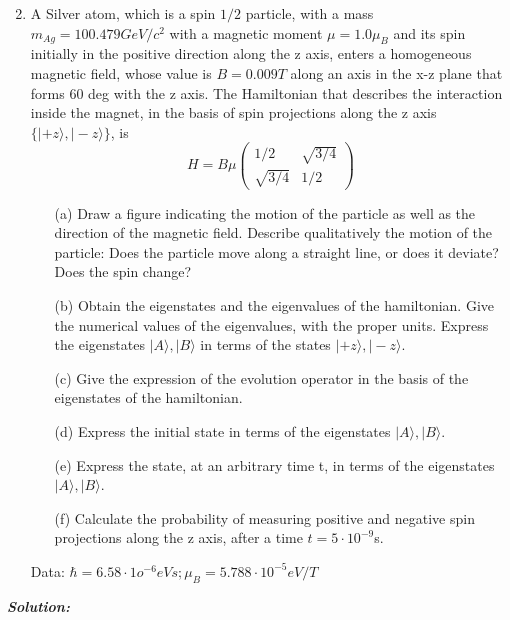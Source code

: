 \documentclass{article}
\begin{document}
\begin{mybox}
        \begin{enumerate}
        \setcounter{enumi}{1}
        \item A Silver atom, which is a spin $1/2$ particle, with a mass $m_{Ag} = 100.479 GeV/c^2$ with a magnetic moment $\mu= 1.0\mu_B$ and its spin initially in the positive direction along the z axis, enters a homogeneous magnetic field, whose value is $B = 0.009 T$ along an axis in the x-z plane that forms $60$ deg with the z axis. The Hamiltonian that describes the interaction inside the magnet, in the basis of spin projections along the z axis $\{|+z\rangle,|-z\rangle\}$, is
        $$
        H=B\mu \begin{pmatrix}
                    1/2 & \sqrt{3/4}\\
                    \sqrt{3/4} & 1/2
                \end{pmatrix}
        $$
            \begin{itemize}
                \item[(a)] Draw a figure indicating the motion of the particle as well as the direction of the magnetic field. Describe qualitatively the motion of the particle: Does the particle move along a straight line, or does it deviate? Does the spin change?
                \item[(b)] Obtain the eigenstates and the eigenvalues of the hamiltonian. Give the numerical values of the eigenvalues, with the proper units. Express the eigenstates $|A\rangle,|B\rangle$ in terms of the states $|+z\rangle,|-z\rangle$.
                \item[(c)] Give the expression of the evolution operator in the basis of the eigenstates of the hamiltonian.
                \item[(d)] Express the initial state in terms of the eigenstates $|A\rangle,|B\rangle$.
                \item[(e)] Express the state, at an arbitrary time t, in terms of the eigenstates $|A\rangle,|B\rangle$.
                \item[(f)] Calculate the probability of measuring positive and negative spin projections along the z axis, after a time $t = 5\cdot 10^{-9} $s.
            \end{itemize}
        Data: $\hbar = 6.58 \cdot 1o^{-6} eV s; \mu_B = 5.788 \cdot10^{-5} eV/T$
        \end{enumerate}
\end{mybox}
\emph{\bfseries Solution:} \\
\end{document}
